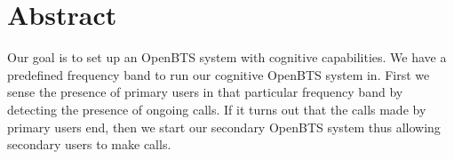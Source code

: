 \section*{Abstract}
Our goal is to set up an OpenBTS system with cognitive capabilities. We have a predefined frequency band to run our cognitive OpenBTS system in. First we sense the presence of primary users in that particular frequency band by detecting the presence of ongoing calls. If it turns out that the calls made by primary users end, then we start our secondary OpenBTS system thus allowing secondary users to make calls.
